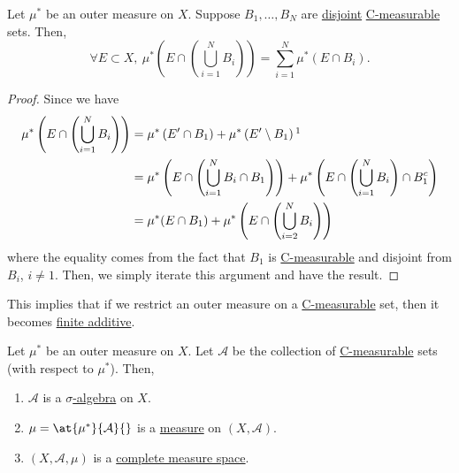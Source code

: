 \begin{lemma}\label{lma:disjoint-C-measurable-finite-additive}
	Let \(\mu^{*} \) be an outer measure on \(X\). Suppose \(B_1, \ldots , B_N \) are \underline{disjoint} \hyperref[def:C-measurable]{C-measurable} sets.
	Then,
	\[
		\forall E\subset X,\ \mu^{*} \left(E\cap \left(\bigcup\limits_{i=1}^{N} B_{i}\right)\right) = \sum\limits_{i=1}^{N} \mu^{*} \left(E\cap B_i\right).
	\]
\end{lemma}
\begin{proof}
	Since we have
	\[
		\begin{split}
			\mu^{*} \left(E\cap \left(\bigcup\limits_{i=1}^{N} B_{i}\right)\right)
			&= \mu^{*} \left( E^\prime  \cap B_1\right) + \mu^{*} \left(E ^\prime \setminus B_1\right)\footnotemark\\
			&= \mu^{*} \left(E\cap \left(\bigcup\limits_{i=1}^{N} B_{i}\cap B_1\right)\right) + \mu^{*} \left(E\cap \left(\bigcup\limits_{i=1}^{N} B_{i}\right)\cap B^{c}_1\right)\\
			&= \mu^{*} (E\cap B_1) + \mu^{*} \left(E\cap \left(\bigcup\limits_{i=2}^{N} B_{i}\right)\right)
		\end{split}
	\]
	where the equality comes from the fact that \(B_1 \) is \hyperref[def:C-measurable]{C-measurable} and disjoint from \(B_{i}\), \(i\neq 1\). Then, we simply iterate this argument
	and have the result.
\end{proof}
\begin{remark}
	This implies that if we restrict an outer measure on a \hyperref[def:C-measurable]{C-measurable} set, then it becomes \underline{finite additive}.
\end{remark}

\begin{theorem}\label{thm:Caratheodory-extension-Thm}
	Let \(\mu^{*} \) be an outer measure on \(X\). Let \(\mathcal{A} \) be the collection of \hyperref[def:C-measurable]{C-measurable} sets (with respect to \(\mu^{*} \)).
	Then,
	\begin{enumerate}
		\item \(\mathcal{A}\) is a \hyperref[def:sigma-algebra]{\(\sigma\)-algebra} on \(X\).
		\item \(\mu = \at{\mu^{*} }{\mathcal{A} }{}\) is a \hyperref[def:measure]{measure} on \((X, \mathcal{A})\).
		\item \((X, \mathcal{A} , \mu)\) is a \hyperref[def:complete-measure-space]{complete measure space}.
	\end{enumerate}
\end{theorem}

